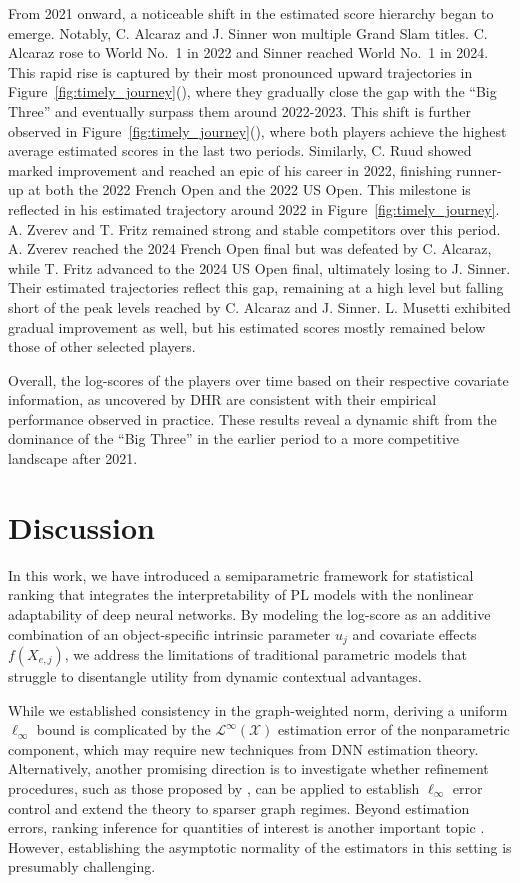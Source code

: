 \documentclass[
  12pt]{article}
\begin{document}
From 2021 onward, a noticeable shift in the estimated score hierarchy began to emerge. Notably, C. Alcaraz and J. Sinner won multiple Grand Slam titles. C. Alcaraz rose to World No.~1 in 2022 and Sinner reached World No.~1 in 2024. This rapid rise is captured by their most pronounced upward trajectories in Figure~\ref{fig:timely_journey}(), where they gradually close the gap with the ``Big Three'' and eventually surpass them around 2022-2023. This shift is further observed in Figure~\ref{fig:timely_journey}(), where both players achieve the highest average estimated scores in the last two periods. Similarly, C. Ruud showed marked improvement and reached an epic of his career in 2022, finishing runner-up at both the 2022 French Open and the 2022 US Open. This milestone is reflected in his estimated trajectory around 2022 in Figure~\ref{fig:timely_journey}. 
A. Zverev and T. Fritz remained strong and stable competitors over this period. A. Zverev reached the 2024 French Open final but was defeated by C. Alcaraz, while T. Fritz advanced to the 2024 US Open final, ultimately losing to J. Sinner.  Their estimated trajectories reflect this gap, remaining at a high level but falling short of the peak levels reached by C. Alcaraz and J. Sinner. L. Musetti exhibited gradual improvement as well, but his estimated scores mostly remained below those of other selected players.

Overall, the log-scores of the players over time based on their respective covariate information, as uncovered by DHR are consistent with their empirical performance observed in practice. These results reveal a dynamic shift from the dominance of the ``Big Three'' in the earlier period to a more competitive landscape after 2021.

\section{Discussion}
In this work, we have introduced a semiparametric framework for statistical ranking that integrates the interpretability of PL models with the nonlinear adaptability of deep neural networks. By modeling the log-score as an additive combination of an object-specific intrinsic parameter $u_j$ and covariate effects $f(X_{e,j})$, we address the limitations of traditional parametric models that struggle to disentangle utility from dynamic contextual advantages.

While we established consistency in the graph-weighted norm, deriving a uniform $\ell_\infty$ bound is complicated by the $\mathcal{L}^\infty(\mathcal{X})$ estimation error of the nonparametric component, which may require new techniques from DNN estimation theory.  Alternatively, another promising direction is to investigate whether refinement procedures, such as those proposed by \citet{chen2024anote}, can be applied to establish $\ell_{\infty}$ error control and extend the theory to sparser graph regimes. Beyond estimation errors, ranking inference for quantities of interest is another important topic \citep{yan2025likelihood,fan2025spectral,han2025unifiedanalysis}. However, establishing the asymptotic normality of the estimators in this setting is presumably challenging.
\end{document}
